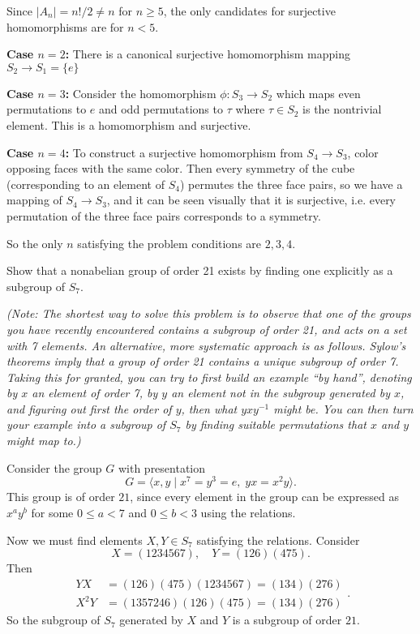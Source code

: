 \documentclass[11pt,letterpaper]{article}
\begin{document}
Since $|A_n|=n!/2\neq n$ for $n\geq 5$, the only candidates for surjective homomorphisms are for $n<5$.

\textbf{Case $n=2$:} There is a canonical surjective homomorphism mapping $S_2\to S_1=\{e\}$   

\textbf{Case $n=3$:} Consider the homomorphism $\phi : S_3 \to S_2$ which maps even permutations to $e$ and odd permutations to $\tau$ where $\tau\in S_2$ is the nontrivial element. This is a homomorphism and surjective.

\textbf{Case $n=4$:} To construct a surjective homomorphism from $S_4\to S_3$, color opposing faces with the same color. Then every symmetry of the cube (corresponding to an element of $S_4$) permutes the three face pairs, so we have a mapping of $S_4\to S_3$, and it can be seen visually that it is surjective, i.e. every permutation of the three face pairs corresponds to a symmetry.

So the only $n$ satisfying the problem conditions are $2,3,4$. 

\pagebreak
\begin{problem}
Show that a nonabelian group of order 21 exists by finding
one explicitly as a subgroup of $S_7$.
\end{problem}
\textit{(Note: The shortest way to solve this problem is to observe that one of the
groups you have recently encountered contains a subgroup of order 21,
and acts on a set with 7 elements. An alternative, more systematic approach is as follows.
Sylow's theorems imply that a group of order 21
contains a unique subgroup of order 7. Taking this for granted, you can 
try to first build
an example ``by hand'', denoting by $x$ an element of order 7, by $y$ an
element not in the subgroup generated by $x$, and figuring out first the
order of $y$, then what $yxy^{-1}$ might be. 
You can then turn your example into a
subgroup of $S_7$ by finding suitable permutations that $x$ and $y$
might map to.)}

Consider the group $G$ with presentation
\[
  G=\big\langle x,y \mid x^7=y^3=e,\; yx=x^2y \big\rangle
.\] 
This group is of order $21$, since every element in the group can be expressed as $x^ay^b$ for some $0\leq a<7$ and $0\leq b< 3$ using the relations. 

Now we must find elements $X,Y\in S_7$ satisfying the relations. Consider
\[
  X=(1234567),\quad Y=(126)(475)
.\]  
Then
\[
  \begin{aligned}
    YX &= (126)(475)(1234567) = (134)(276)\\
    X^2Y &= (1357246)(126)(475) = (134)(276)
  \end{aligned}
.\] 
So the subgroup of $S_7$ generated by $X$ and $Y$ is a subgroup of order $21$.   
\end{document}
